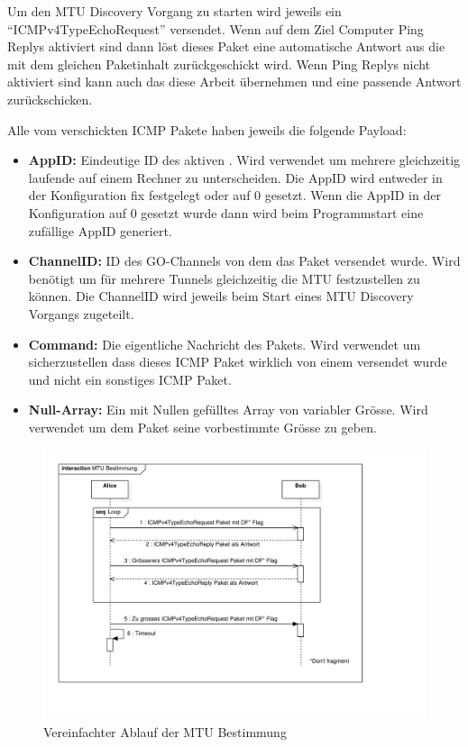 Um den \acs{MTU} Discovery Vorgang zu starten wird jeweils ein \enquote{ICMPv4TypeEchoRequest} versendet. Wenn auf dem Ziel Computer Ping Replys aktiviert sind dann löst dieses Paket eine automatische Antwort aus die mit dem gleichen Paketinhalt zurückgeschickt wird. Wenn Ping Replys nicht aktiviert sind kann auch das \tool{} diese Arbeit übernehmen und eine passende Antwort zurückschicken.

Alle vom \tool{} verschickten \acs{ICMP} Pakete haben jeweils die folgende Payload:

\begin{itemize}
  \item \textbf{AppID:} Eindeutige ID des aktiven \tool{}. Wird verwendet um mehrere gleichzeitig laufende \tool{} auf einem Rechner zu unterscheiden. Die AppID wird entweder in der Konfiguration fix festgelegt oder auf 0 gesetzt. Wenn die AppID in der Konfiguration auf 0 gesetzt wurde dann wird beim Programmstart eine zufällige AppID generiert.
  \item \textbf{ChannelID:} ID des GO-Channels von dem das Paket versendet wurde. Wird benötigt um für mehrere Tunnels gleichzeitig die \acs{MTU} festzustellen zu können. Die ChannelID wird jeweils beim Start eines \acs{MTU} Discovery Vorgangs zugeteilt.
  \item \textbf{Command:} Die eigentliche Nachricht des Pakets. Wird verwendet um sicherzustellen dass dieses \acs{ICMP} Paket wirklich von einem \tool{} versendet wurde und nicht ein sonstiges \acs{ICMP} Paket.
  \item \textbf{Null-Array:} Ein mit Nullen gefülltes Array von variabler Grösse. Wird verwendet um dem Paket seine vorbestimmte Grösse zu geben.
\end{itemize}

\begin{figure}[H]
    \begin{center}
        \includegraphics[trim=30 80 140 20,clip,width=\textwidth]{mainpart/implementation/img/MTUBestimmungErfolgreich}
    \end{center}
    \caption{Vereinfachter Ablauf der MTU Bestimmung}
\end{figure}

